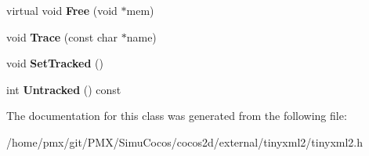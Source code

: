 \begin{DoxyCompactItemize}
\item 
\mbox{\label{classtinyxml2_1_1MemPoolT_a4f1a0c434e9e3d7391e5c16ed4ee8c70}} 
virtual void {\bfseries Free} (void $\ast$mem)
\item 
\mbox{\label{classtinyxml2_1_1MemPoolT_a0bc596f271e0f139822c534238b3f244}} 
void {\bfseries Trace} (const char $\ast$name)
\item 
\mbox{\label{classtinyxml2_1_1MemPoolT_a7798932414916199a1bc0f9c3f368521}} 
void {\bfseries Set\+Tracked} ()
\item 
\mbox{\label{classtinyxml2_1_1MemPoolT_a365d95526f22abe08e306d63e30c0b51}} 
int {\bfseries Untracked} () const
\end{DoxyCompactItemize}


The documentation for this class was generated from the following file\+:\begin{DoxyCompactItemize}
\item 
/home/pmx/git/\+P\+M\+X/\+Simu\+Cocos/cocos2d/external/tinyxml2/tinyxml2.\+h\end{DoxyCompactItemize}

